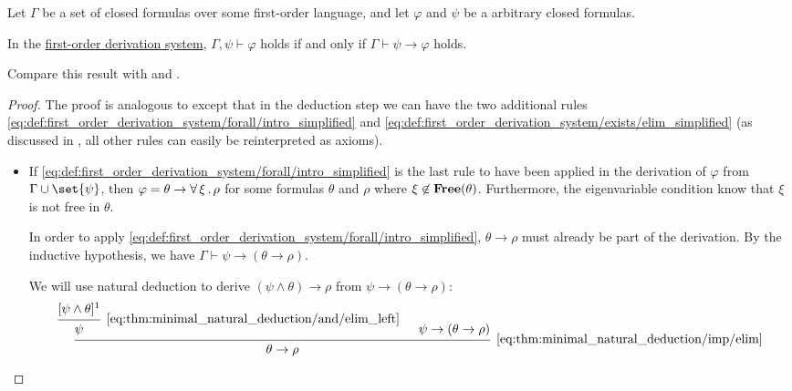 \begin{theorem}\label{thm:first_order_syntactic_deduction_theorem}
  Let \( \Gamma \) be a set of closed formulas over some first-order language, and let \( \varphi \) and \( \psi \) be a arbitrary closed formulas.

  In the \hyperref[def:minimal_propositional_derivation_system]{first-order derivation system}, \( \Gamma, \psi \vdash \varphi \) holds if and only if \( \Gamma \vdash \psi \rightarrow \varphi \) holds.

  Compare this result with  and .
\end{theorem}
\begin{proof}
  The proof is analogous to  except that in the deduction step we can have the two additional rules \eqref{eq:def:first_order_derivation_system/forall/intro_simplified} and \eqref{eq:def:first_order_derivation_system/exists/elim_simplified} (as discussed in , all other rules can easily be reinterpreted as axioms).

  \begin{itemize}
    \item If \eqref{eq:def:first_order_derivation_system/forall/intro_simplified} is the last rule to have been applied in the derivation of \( \varphi \) from \( \Gamma \cup \set{ \psi } \), then \( \varphi = \theta \rightarrow \forall \thinspace \xi \thinspace . \thinspace \rho \) for some formulas \( \theta \) and \( \rho \) where \( \xi \not\in \operatorname{\mathbf{Free}}(\theta) \). Furthermore, the eigenvariable condition know that \( \xi \) is not free in \( \theta \).

    In order to apply \eqref{eq:def:first_order_derivation_system/forall/intro_simplified}, \( \theta \rightarrow \rho \) must already be part of the derivation. By the inductive hypothesis, we have \( \Gamma \vdash \psi \rightarrow (\theta \rightarrow \rho) \).

    We will use natural deduction to derive \( (\psi \wedge \theta) \rightarrow \rho \) from \( \psi \rightarrow (\theta \rightarrow \rho) \):
    \begin{equation*}
      \begin{prooftree}
        \hypo{ [\psi \wedge \theta]^1 }
        \infer1[\eqref{eq:thm:minimal_natural_deduction/and/elim_left}]{ \psi }
        \hypo{ \psi \rightarrow (\theta \rightarrow \rho) }
        \infer2[\eqref{eq:thm:minimal_natural_deduction/imp/elim}]{ \theta \rightarrow \rho }


\end{prooftree}
\end{equation*}
\end{itemize}
\end{proof}
